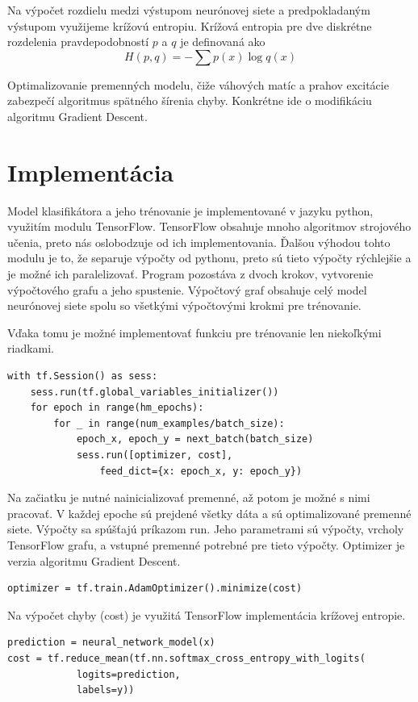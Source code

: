 Na výpočet rozdielu medzi výstupom neurónovej siete a predpokladaným výstupom využijeme krížovú entropiu.
Krížová entropia pre dve diskrétne rozdelenia pravdepodobností \(p\) a \(q\) je definovaná ako \[H(p,q) = - \sum p(x)\log q(x)\]

Optimalizovanie premenných modelu, čiže váhových matíc a prahov excitácie zabezpečí algoritmus spätného šírenia chyby.
Konkrétne ide o modifikáciu algoritmu Gradient Descent.

\section{Implementácia}
Model klasifikátora a jeho trénovanie je implementované v jazyku python, využitím modulu TensorFlow.
TensorFlow obsahuje mnoho algoritmov strojového učenia, preto nás oslobodzuje od ich implementovania.
Ďalšou výhodou tohto modulu je to, že separuje výpočty od pythonu, preto sú tieto výpočty rýchlejšie a je možné ich paralelizovať.
Program pozostáva z dvoch krokov, vytvorenie výpočtového grafu a jeho spustenie.
Výpočtový graf obsahuje celý model neurónovej siete spolu so všetkými výpočtovými krokmi pre trénovanie.

Vďaka tomu je možné implementovať funkciu pre trénovanie len niekoľkými riadkami.
\begin{verbatim}
with tf.Session() as sess:
	sess.run(tf.global_variables_initializer())
	for epoch in range(hm_epochs):
		for _ in range(num_examples/batch_size):
			epoch_x, epoch_y = next_batch(batch_size)
			sess.run([optimizer, cost], 
				feed_dict={x: epoch_x, y: epoch_y})
\end{verbatim}

Na začiatku je nutné nainicializovať premenné, až potom je možné s nimi pracovať.
V každej epoche sú prejdené všetky dáta a sú optimalizované premenné siete.
Výpočty sa spúšťajú príkazom run.
Jeho parametrami sú výpočty, vrcholy TensorFlow grafu, a vstupné premenné potrebné pre tieto výpočty.
Optimizer je verzia algoritmu Gradient Descent.
\begin{verbatim}
optimizer = tf.train.AdamOptimizer().minimize(cost)
\end{verbatim}
Na výpočet chyby (cost) je využitá TensorFlow implementácia krížovej entropie.
\begin{verbatim}
prediction = neural_network_model(x)
cost = tf.reduce_mean(tf.nn.softmax_cross_entropy_with_logits(
			logits=prediction, 
			labels=y))
\end{verbatim}
